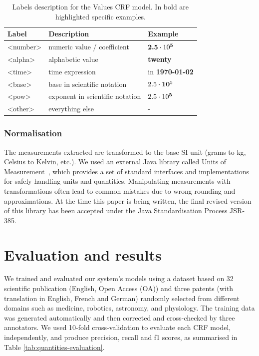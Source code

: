 \documentclass[sigconf]{acmart}
\begin{document}
\begin{table}[ht]
  \caption{Labels description for the Values CRF model. In bold are highlighted specific examples.}
  \label{tab:values-model-labels}
  \begin{tabular}{lll}
    \toprule
    Label & Description & Example\\
    \midrule
    <number> & numeric value / coefficient & $\textbf{2.5}\cdot10\textsuperscript{\textbf{5}}$ \\
    <alpha> & alphabetic value & \textbf{twenty} \\
    <time> & time expression  & in \textbf{1970-01-02}\\
    <base> & base in scientific notation & $2.5\cdot\textbf{10}\textsuperscript{5}$\\
    <pow> & exponent in scientific notation & $2.5\cdot10\textsuperscript{\textbf{5}}$ \\
    <other> & everything else & - \\
  \bottomrule
\end{tabular}
\end{table}

\subsubsection{Normalisation}

The measurements extracted are transformed to the base SI unit (grams to kg, Celsius to Kelvin, etc.). We used an external Java library called Units of Measurement~\cite{units_of_measurement}, which provides a set of standard interfaces and implementations for safely handling units and quantities. Manipulating measurements with transformations often lead to common mistakes due to wrong rounding and approximations. 
At the time this paper is being written, the final revised version of this library has been accepted under the Java Standardisation Process JSR-385.

\section{Evaluation and results}
\label{sec:results}

We trained and evaluated our system's models using a dataset based on 32 scientific publication (English, Open Access (OA)) and three patents (with translation in English, French and German) randomly selected from different domains such as medicine, robotics, astronomy, and physiology. The training data was generated automatically and then corrected and cross-checked by three annotators. We used 10-fold cross-validation to evaluate each CRF model, independently, and produce precision, recall and f1 scores, as summarised in Table \ref{tab:quantities-evaluation}. 
\end{document}
